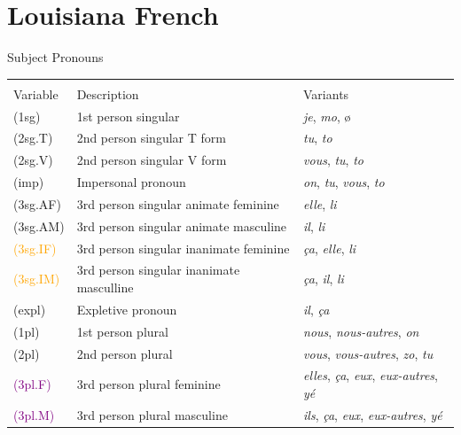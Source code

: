 \documentclass{beamer}\usepackage[]{graphicx}\usepackage[]{color}
\newcommand{\lexi}[1]{\textit{#1}}
\begin{document}
  \section{Louisiana French}
    \begin{frame}{Subject Pronouns}
      \begin{center}
        {\footnotesize
        \begin{tabular}{l l l}
                    &                                          & \\
          Variable  & Description                              & Variants \\
          \hline
          (1sg)     & 1st person singular                      & \lexi{je}, \lexi{mo}, ø \\
          (2sg.T)   & 2nd person singular T form               & \lexi{tu}, \lexi{to} \\
          (2sg.V)   & 2nd person singular V form               & \lexi{vous}, \lexi{tu}, \lexi{to} \\
          (imp)     & Impersonal pronoun                       & \lexi{on}, \lexi{tu}, \lexi{vous}, \lexi{to} \\
          (3sg.AF)  & 3rd person singular animate feminine     & \lexi{elle}, \lexi{li} \\
          (3sg.AM)  & 3rd person singular animate masculine    & \lexi{il}, \lexi{li} \\
          \textcolor{orange}{(3sg.IF)}  & 3rd person singular inanimate feminine   & \lexi{ça}, \lexi{elle}, \lexi{li} \\
          \textcolor{orange}{(3sg.IM)}  & 3rd person singular inanimate masculline & \lexi{ça}, \lexi{il}, \lexi{li} \\
          (expl)    & Expletive pronoun                        & \lexi{il}, \lexi{ça} \\
          (1pl)     & 1st person plural                        & \lexi{nous}, \lexi{nous-autres}, \lexi{on} \\
          (2pl)     & 2nd person plural                        & \lexi{vous}, \lexi{vous-autres}, \lexi{zo}, \lexi{tu} \\
          \textcolor{purple}{(3pl.F)}   & 3rd person plural feminine               & \lexi{elles}, \lexi{ça}, \lexi{eux}, \lexi{eux-autres}, \lexi{yé} \\
          \textcolor{purple}{(3pl.M)}   & 3rd person plural masculine              & \lexi{ils}, \lexi{ça}, \lexi{eux}, \lexi{eux-autres}, \lexi{yé} \\
        \end{tabular}
        }
      \end{center}
    \end{frame}
\end{document}
